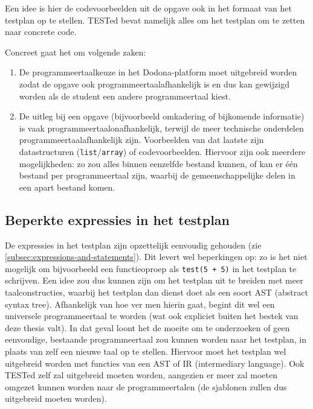 Een idee is hier de codevoorbeelden uit de opgave ook in het formaat van het testplan op te stellen.
TESTed bevat namelijk alles om het testplan om te zetten naar concrete code.

Concreet gaat het om volgende zaken:
\begin{enumerate}
    \item De programmeertaalkeuze in het Dodona-platform moet uitgebreid worden zodat de opgave ook programmeertaalafhankelijk is en dus kan gewijzigd worden als de student een andere programmeertaal kiest.
    \item De uitleg bij een opgave (bijvoorbeeld omkadering of bijkomende informatie) is vaak programmeertaalonafhankelijk, terwijl de meer technische onderdelen programmeertaalafhankelijk zijn.
    Voorbeelden van dat laatste zijn datastructuren (\texttt{list}/\texttt{array}) of codevoorbeelden.
    Hiervoor zijn ook meerdere mogelijkheden: zo zou alles binnen eenzelfde bestand kunnen, of kan er één bestand per programmeertaal zijn, waarbij de gemeenschappelijke delen in een apart bestand komen.
\end{enumerate}

\subsection{Beperkte expressies in het testplan}\label{subsec:beperkte-expressies-in-het-testplan}

De expressies in het testplan zijn opzettelijk eenvoudig gehouden (zie \cref{subsec:expressions-and-statements}).
Dit levert wel beperkingen op: zo is het niet mogelijk om bijvoorbeeld een functieoproep als \texttt{test(5 + 5)} in het testplan te schrijven.
Een idee zou dus kunnen zijn om het testplan uit te breiden met meer taalconstructies, waarbij het testplan dan dienst doet als een soort AST (abstract syntax tree).
Afhankelijk van hoe ver men hierin gaat, begint dit wel een universele programmeertaal te worden (wat ook expliciet buiten het bestek van deze thesis valt).
In dat geval loont het de moeite om te onderzoeken of geen eenvoudige, bestaande programmeertaal  zou kunnen worden naar het testplan, in plaats van zelf een nieuwe taal op te stellen.
Hiervoor moet het testplan wel uitgebreid worden met functies van een AST of IR (intermediary language).
Ook TESTed zelf zal uitgebreid moeten worden, aangezien er meer zal moeten omgezet kunnen worden naar de programmeertalen (de sjablonen zullen dus uitgebreid moeten worden).

